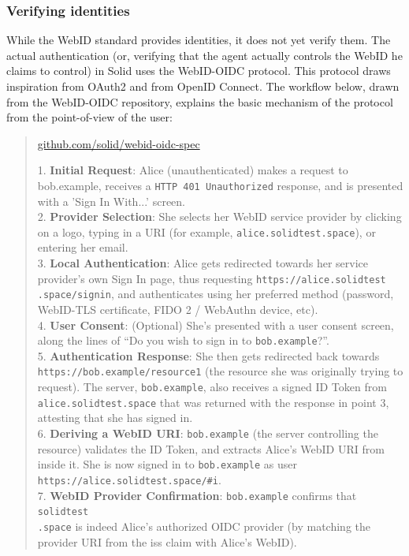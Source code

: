 \subsubsection{Verifying identities}
While the WebID standard provides identities, it does not yet verify them. The actual authentication (or, verifying that the agent actually controls the WebID he claims to control) in Solid uses the WebID-OIDC protocol. This protocol draws inspiration from OAuth2 and from OpenID Connect. The workflow below, drawn from the WebID-OIDC repository, explains the basic mechanism of the protocol from the point-of-view of the user:

\begin{quote}{\href{https://github.com/solid/webid-oidc-spec}{github.com/solid/webid-oidc-spec}}

    1. \textbf{Initial Request}: Alice (unauthenticated) makes a request to bob.example, receives a \texttt{HTTP 401 Unauthorized} response, and is presented with a 'Sign In With...' screen.\\
    
    2. \textbf{Provider Selection}: She selects her WebID service provider by clicking on a logo, typing in a URI (for example, \texttt{alice.solidtest.space}), or entering her email.\\
    
    3. \textbf{Local Authentication}: Alice gets redirected towards her service provider's own Sign In page, thus requesting \texttt{https://alice.solidtest\\.space/signin}, and authenticates using her preferred method (password, WebID-TLS certificate, FIDO 2 / WebAuthn device, etc).\\
    
    4. \textbf{User Consent}: (Optional) She's presented with a user consent screen, along the lines of ``Do you wish to sign in to \texttt{bob.example}?''.\\
    
    5. \textbf{Authentication Response}: She then gets redirected back towards \texttt{https://bob.example/resource1} (the resource she was originally trying to request). The server, \texttt{bob.example}, also receives a signed ID Token from \texttt{alice.solidtest.space} that was returned with the response in point 3, attesting that she has signed in.\\
    
    6. \textbf{Deriving a WebID URI}: \texttt{bob.example} (the server controlling the resource) validates the ID Token, and extracts Alice's WebID URI from inside it. She is now signed in to \texttt{bob.example} as user\\ \texttt{https://alice.solidtest.space/\#i}.\\
    
    7. \textbf{WebID Provider Confirmation}: \texttt{bob.example} confirms that \texttt{solidtest\\.space} is indeed Alice's authorized OIDC provider (by matching the provider URI from the iss claim with Alice's WebID).
\end{quote}

